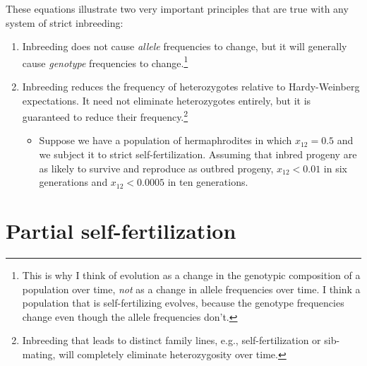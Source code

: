 \documentclass[12pt]{article}
\begin{document}
These equations illustrate two very important principles that are true
with any system of strict inbreeding:

\begin{enumerate}

\item Inbreeding does not cause {\it allele\/} frequencies to change,
  but it will generally cause {\it genotype\/} frequencies to
  change.\footnote{This is why I think of evolution as a change in the
    genotypic composition of a population over time, {\it not} as a
    change in allele frequencies over time. I think a population that
    is self-fertilizing evolves, because the genotype frequencies
    change even though the allele frequencies don't.}

\item Inbreeding reduces the frequency of heterozygotes relative to
  Hardy-Weinberg expectations. It need not eliminate heterozygotes
  entirely, but it is guaranteed to reduce their
  frequency.\footnote{Inbreeding that leads to distinct family lines,
    e.g., self-fertilization or sib-mating, will completely eliminate
    heterozygosity over time.}

\begin{itemize}

\item Suppose we have a population of hermaphrodites in which $x_{12}
= 0.5$ and we subject it to strict self-fertilization. Assuming that
inbred progeny are as likely to survive and reproduce as outbred
progeny, $x_{12} < 0.01$ in six generations and $x_{12} < 0.0005$ in
ten generations.

\end{itemize}

\end{enumerate}

\section*{Partial self-fertilization}
\end{document}
